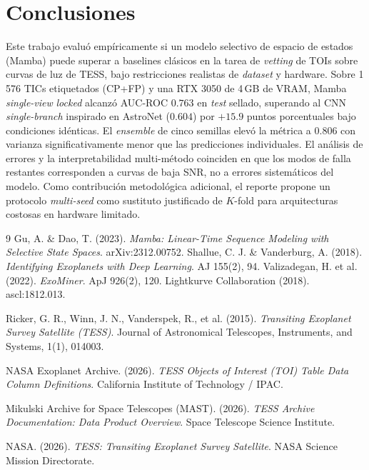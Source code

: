 \documentclass[11pt,a4paper]{article}
\begin{document}
\section{Conclusiones}
\label{sec:conclusions}

Este trabajo evaluó empíricamente si un modelo selectivo de espacio
de estados (Mamba) puede superar a baselines clásicos en la tarea
de \textit{vetting} de TOIs sobre curvas de luz de TESS, bajo
restricciones realistas de \textit{dataset} y hardware. Sobre
1\,576 TICs etiquetados (CP+FP) y una RTX 3050 de 4\,GB de VRAM,
Mamba \textit{single-view} \textit{locked} alcanzó AUC-ROC $0.763$
en \textit{test} sellado, superando al CNN \textit{single-branch}
inspirado en AstroNet ($0.604$) por $+15.9$ puntos porcentuales bajo
condiciones idénticas. El \textit{ensemble} de cinco semillas elevó
la métrica a $0.806$ con varianza significativamente menor que las
predicciones individuales. El análisis de errores y la
interpretabilidad multi-método coinciden en que los modos de falla
restantes corresponden a curvas de baja SNR, no a errores
sistemáticos del modelo. Como contribución metodológica adicional,
el reporte propone un protocolo \textit{multi-seed} como sustituto
justificado de $K$-fold para arquitecturas costosas en hardware
limitado.


\begin{thebibliography}{9}
 Gu, A. \& Dao, T. (2023).
  \textit{Mamba: Linear-Time Sequence Modeling with Selective State Spaces}.
  arXiv:2312.00752.
 Shallue, C. J. \& Vanderburg, A. (2018).
  \textit{Identifying Exoplanets with Deep Learning}. AJ 155(2), 94.
 Valizadegan, H. et al. (2022). \textit{ExoMiner}. ApJ 926(2), 120.
 Lightkurve Collaboration (2018). ascl:1812.013.

Ricker, G. R., Winn, J. N., Vanderspek, R., et al. (2015).
\textit{Transiting Exoplanet Survey Satellite (TESS)}.
Journal of Astronomical Telescopes, Instruments, and Systems, 1(1), 014003.

NASA Exoplanet Archive. (2026).
\textit{TESS Objects of Interest (TOI) Table Data Column Definitions}.
California Institute of Technology / IPAC.

Mikulski Archive for Space Telescopes (MAST). (2026).
\textit{TESS Archive Documentation: Data Product Overview}.
Space Telescope Science Institute.

NASA. (2026).
\textit{TESS: Transiting Exoplanet Survey Satellite}.
NASA Science Mission Directorate.
\end{thebibliography}

\end{document}

